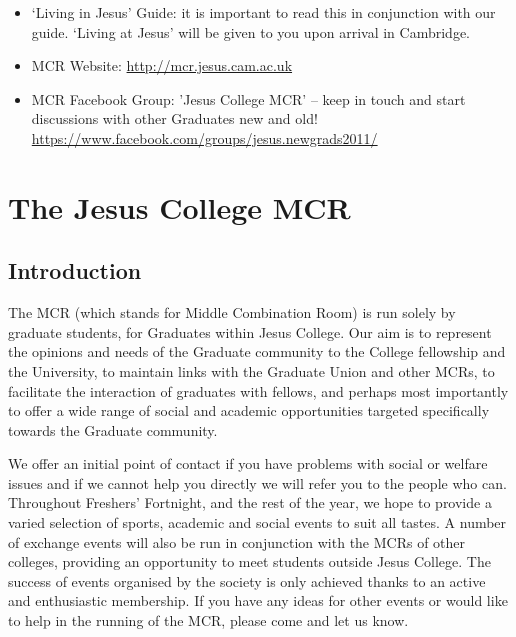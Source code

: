 \documentclass[11pt,fleqn, oneside]{book} %
\begin{document}
\begin{itemize}
\item ‘Living in Jesus’ Guide: it is important to read this in conjunction with our guide.  ‘Living at Jesus’ will be given to you upon arrival in Cambridge.
\item MCR Website: \url{http://mcr.jesus.cam.ac.uk}
\item MCR Facebook Group:  'Jesus College MCR’ – keep in touch and start discussions with other Graduates new and old!
	\url{https://www.facebook.com/groups/jesus.newgrads2011/}
\end{itemize}






 



\chapter{The Jesus College MCR}

\section{Introduction}

The MCR (which stands for Middle Combination Room) is run solely by graduate students, for Graduates within Jesus College. Our aim is to represent the opinions and needs of the Graduate community to the College fellowship and the University, to maintain links with the Graduate Union and other MCRs, to facilitate the interaction of graduates with fellows, and perhaps most importantly to offer a wide range of social and academic opportunities targeted specifically towards the Graduate community. 

We offer an initial point of contact if you have problems with social or welfare issues and if we cannot help you directly we will refer you to the people who can. Throughout Freshers’ Fortnight, and the rest of the year, we hope to provide a varied selection of sports, academic and social events to suit all tastes. A number of exchange events will also be run in conjunction with the MCRs of other colleges, providing an opportunity to meet students outside Jesus College. The success of events organised by the society is only achieved thanks to an active and enthusiastic membership. If you have any ideas for other events or would like to help in the running of the MCR, please come and let us know.  
\end{document}
